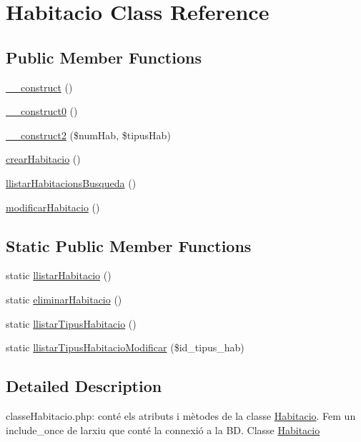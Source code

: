 \hypertarget{classHabitacio}{}\section{Habitacio Class Reference}
\label{classHabitacio}
\subsection*{Public Member Functions}
\begin{DoxyCompactItemize}
\item 
\hyperlink{classHabitacio_a274eb9ebcca42e2635eccea7648b0c5b}{\+\_\+\+\_\+construct} ()
\item 
\hyperlink{classHabitacio_a545aacd985cb5b5f4d3e80169331c06d}{\+\_\+\+\_\+construct0} ()
\item 
\hyperlink{classHabitacio_af2fb73840620892481cdc02ee7c8613a}{\+\_\+\+\_\+construct2} (\$num\+Hab, \$tipus\+Hab)
\item 
\hyperlink{classHabitacio_a6df5806c3f663cfb861c8a4ba5e93f92}{crear\+Habitacio} ()
\item 
\hyperlink{classHabitacio_a61f54c2495b053e3623c348f770841a0}{llistar\+Habitacions\+Busqueda} ()
\item 
\hyperlink{classHabitacio_a1483cc2f580ff5899a1082a7923b3b84}{modificar\+Habitacio} ()
\end{DoxyCompactItemize}
\subsection*{Static Public Member Functions}
\begin{DoxyCompactItemize}
\item 
static \hyperlink{classHabitacio_a3cebcb1b14e07dd3449d52666f009d97}{llistar\+Habitacio} ()
\item 
static \hyperlink{classHabitacio_ac8583e72d94916a988cb25851b9e5e3a}{eliminar\+Habitacio} ()
\item 
static \hyperlink{classHabitacio_a0304b5019134fc969965c34b3e9764ce}{llistar\+Tipus\+Habitacio} ()
\item 
static \hyperlink{classHabitacio_a48a35e2aea2cb1a0a169750160bf1553}{llistar\+Tipus\+Habitacio\+Modificar} (\$id\+\_\+tipus\+\_\+hab)
\end{DoxyCompactItemize}


\subsection{Detailed Description}
classe\+Habitacio.\+php\+: conté els atributs i mètodes de la classe \hyperlink{classHabitacio}{Habitacio}. Fem un include\+\_\+once de l\textquotesingle{}arxiu que conté la connexió a la BD. Classe \hyperlink{classHabitacio}{Habitacio} 

